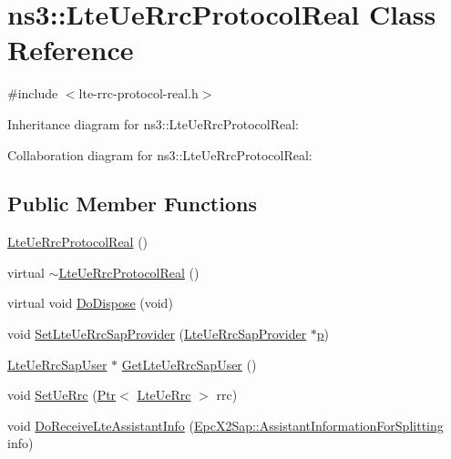 \hypertarget{classns3_1_1LteUeRrcProtocolReal}{}\section{ns3\+:\+:Lte\+Ue\+Rrc\+Protocol\+Real Class Reference}
\label{classns3_1_1LteUeRrcProtocolReal}


{\ttfamily \#include $<$lte-\/rrc-\/protocol-\/real.\+h$>$}



Inheritance diagram for ns3\+:\+:Lte\+Ue\+Rrc\+Protocol\+Real\+:


Collaboration diagram for ns3\+:\+:Lte\+Ue\+Rrc\+Protocol\+Real\+:
\subsection*{Public Member Functions}
\begin{DoxyCompactItemize}
\item 
\hyperlink{classns3_1_1LteUeRrcProtocolReal_a740874e72db7ed82ad202111424650b5}{Lte\+Ue\+Rrc\+Protocol\+Real} ()
\item 
virtual \hyperlink{classns3_1_1LteUeRrcProtocolReal_a1f6b25394baf33ae5614ca493c5dfc5e}{$\sim$\+Lte\+Ue\+Rrc\+Protocol\+Real} ()
\item 
virtual void \hyperlink{classns3_1_1LteUeRrcProtocolReal_a4884be336f08b3dafdd749787aa278d6}{Do\+Dispose} (void)
\item 
void \hyperlink{classns3_1_1LteUeRrcProtocolReal_a4ad4afa1d270fe9bb6f84555a9cdde8b}{Set\+Lte\+Ue\+Rrc\+Sap\+Provider} (\hyperlink{classns3_1_1LteUeRrcSapProvider}{Lte\+Ue\+Rrc\+Sap\+Provider} $\ast$\hyperlink{lte__link__budget__x2__handover__measures_8m_ac9de518908a968428863f829398a4e62}{p})
\item 
\hyperlink{classns3_1_1LteUeRrcSapUser}{Lte\+Ue\+Rrc\+Sap\+User} $\ast$ \hyperlink{classns3_1_1LteUeRrcProtocolReal_ae22e13be8403f2d66a59ab5774ff99ba}{Get\+Lte\+Ue\+Rrc\+Sap\+User} ()
\item 
void \hyperlink{classns3_1_1LteUeRrcProtocolReal_ac2bd987e6f47a7913c11ae9da2ce8a0d}{Set\+Ue\+Rrc} (\hyperlink{classns3_1_1Ptr}{Ptr}$<$ \hyperlink{classns3_1_1LteUeRrc}{Lte\+Ue\+Rrc} $>$ rrc)
\item 
void \hyperlink{classns3_1_1LteUeRrcProtocolReal_aee68a3cbac1a388c8e71220e856d6395}{Do\+Receive\+Lte\+Assistant\+Info} (\hyperlink{structns3_1_1EpcX2Sap_1_1AssistantInformationForSplitting}{Epc\+X2\+Sap\+::\+Assistant\+Information\+For\+Splitting} info)
\end{DoxyCompactItemize}
